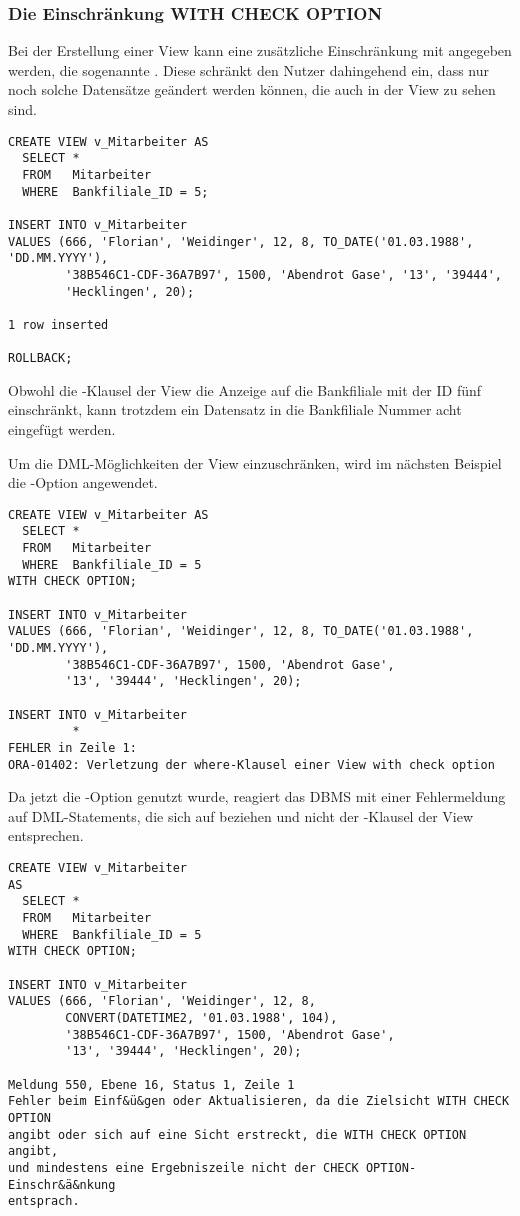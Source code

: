 \subsubsection{Die Einschränkung WITH CHECK OPTION}
\label{CHECK}
Bei der Erstellung einer View kann eine zusätzliche Einschränkung mit angegeben werden, die sogenannte . Diese schränkt den Nutzer dahingehend ein, dass nur noch solche Datensätze geändert werden können, die auch in der View zu sehen sind.
\begin{lstlisting}[language=oracle_sql,caption={Ein Experiment mit den CHECK OPTION},label=sql08_35]
CREATE VIEW v_Mitarbeiter AS
  SELECT *
  FROM   Mitarbeiter
  WHERE  Bankfiliale_ID = 5;

INSERT INTO v_Mitarbeiter
VALUES (666, 'Florian', 'Weidinger', 12, 8, TO_DATE('01.03.1988', 'DD.MM.YYYY'), 
        '38B546C1-CDF-36A7B97', 1500, 'Abendrot Gase', '13', '39444',
        'Hecklingen', 20);

1 row inserted

ROLLBACK;
          \end{lstlisting}
Obwohl die \WHERE-Klausel der View  die Anzeige auf die Bankfiliale mit der ID fünf einschränkt, kann trotzdem ein Datensatz in die Bankfiliale Nummer acht eingefügt werden.

Um die DML-Möglichkeiten der View  einzuschränken, wird im nächsten Beispiel die -Option angewendet.
\begin{lstlisting}[language=oracle_sql,caption={Ein Experiment mit der CHECK OPTION in Oracle},label=sql08_36]
CREATE VIEW v_Mitarbeiter AS
  SELECT *
  FROM   Mitarbeiter
  WHERE  Bankfiliale_ID = 5
WITH CHECK OPTION;

INSERT INTO v_Mitarbeiter
VALUES (666, 'Florian', 'Weidinger', 12, 8, TO_DATE('01.03.1988', 'DD.MM.YYYY'),
        '38B546C1-CDF-36A7B97', 1500, 'Abendrot Gase',
        '13', '39444', 'Hecklingen', 20);

INSERT INTO v_Mitarbeiter
         *
FEHLER in Zeile 1:
ORA-01402: Verletzung der where-Klausel einer View with check option
          \end{lstlisting}
Da jetzt die -Option genutzt wurde, reagiert das DBMS mit einer Fehlermeldung auf DML-Statements, die sich auf  beziehen und nicht der \WHERE-Klausel der View entsprechen.
\begin{lstlisting}[language=ms_sql,caption={Ein Experiment mit der CHECK OPTION in SQL Server},label=sql08_37]
CREATE VIEW v_Mitarbeiter
AS
  SELECT *
  FROM   Mitarbeiter
  WHERE  Bankfiliale_ID = 5
WITH CHECK OPTION;

INSERT INTO v_Mitarbeiter
VALUES (666, 'Florian', 'Weidinger', 12, 8,
        CONVERT(DATETIME2, '01.03.1988', 104),
        '38B546C1-CDF-36A7B97', 1500, 'Abendrot Gase',
        '13', '39444', 'Hecklingen', 20);

Meldung 550, Ebene 16, Status 1, Zeile 1
Fehler beim Einf&ü&gen oder Aktualisieren, da die Zielsicht WITH CHECK OPTION
angibt oder sich auf eine Sicht erstreckt, die WITH CHECK OPTION angibt,
und mindestens eine Ergebniszeile nicht der CHECK OPTION-Einschr&ä&nkung
entsprach.
          \end{lstlisting}
